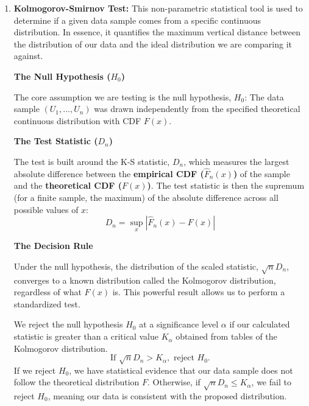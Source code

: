 \begin{enumerate}
    \item \textbf{Kolmogorov-Smirnov Test: }
    This non-parametric statistical tool is used to determine if a given data sample comes from a specific continuous distribution. In essence, it quantifies the maximum vertical distance between the distribution of our data and the ideal distribution we are comparing it against.

    \vspace{1em}
    \noindent\textbf{The Null Hypothesis ($H_0$)}
    \vspace{0.5em}

    The core assumption we are testing is the null hypothesis, $H_0$: The data sample $(U_1, \dots, U_n)$ was drawn independently from the specified theoretical continuous distribution with CDF $F(x)$.

    \vspace{1em}
    \noindent\textbf{The Test Statistic ($D_n$)}
    \vspace{0.5em}

    The test is built around the K-S statistic, $D_n$, which measures the largest absolute difference between the \textbf{empirical CDF ($\hat{F}_n(x)$)} of the sample and the \textbf{theoretical CDF ($F(x)$)}. The test statistic is then the supremum (for a finite sample, the maximum) of the absolute difference across all possible values of $x$:
    \[
    D_n = \sup_{x} |\hat{F}_n(x) - F(x)|
    \]

    \vspace{1em}
    \noindent\textbf{The Decision Rule}
    \vspace{0.5em}

    Under the null hypothesis, the distribution of the scaled statistic, $\sqrt{n}D_n$, converges to a known distribution called the Kolmogorov distribution, regardless of what $F(x)$ is. This powerful result allows us to perform a standardized test.

    We reject the null hypothesis $H_0$ at a significance level $\alpha$ if our calculated statistic is greater than a critical value $K_\alpha$ obtained from tables of the Kolmogorov distribution.
    \[
    \text{If } \sqrt{n}D_n > K_\alpha, \text{ reject } H_0.
    \]
    If we reject $H_0$, we have statistical evidence that our data sample does not follow the theoretical distribution $F$. Otherwise, if $\sqrt{n}D_n \le K_\alpha$, we fail to reject $H_0$, meaning our data is consistent with the proposed distribution.

\end{enumerate}